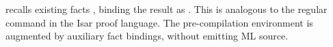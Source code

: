 \begin{isabellebody}
\begin{isamarkuptext}
\begin{description}
  \item {} recalls existing facts , binding the result as .  This is analogous to
  the regular \hyperlink{command.note}{\mbox{}} command in the Isar proof language.
  The pre-compilation environment is augmented by auxiliary fact
  bindings, without emitting ML source.


\end{description}
\end{isamarkuptext}
\end{isabellebody}
